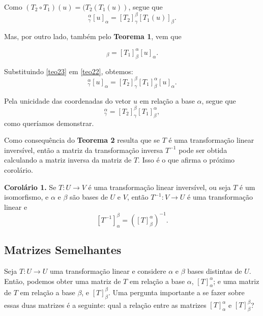 Como $(T_2 \circ T_1)(u)=(T_2 ( T_1(u))$, segue  que
\begin{equation}
[T_2 \circ T_1]_{\gamma}^{\alpha}[u]_{\alpha}=[T_2 ]_{\gamma}^{\beta}[T_1(u)]_{\beta}.\label{teo22}
\end{equation}

Mas, por outro lado, também pelo \textbf{Teorema 1}, vem que

\begin{equation}
[T_1(u)]_{\beta}=[T_1]_{\beta}^{\alpha}[u]_{\alpha}.\label{teo23}
\end{equation}

Substituindo \eqref{teo23} em \eqref{teo22}, obtemos:
\begin{equation}
[T_2 \circ T_1]_{\gamma}^{\alpha}[u]_{\alpha}=[T_2 ]_{\gamma}^{\beta}[T_1]_{\beta}^{\alpha}[u]_{\alpha}.\label{teo24}
\end{equation}

Pela unicidade das coordenadas do vetor $u$ em relação a base $\alpha$, segue que
\begin{equation*}
[T_2 \circ T_1]_{\gamma}^{\alpha}=[T_2 ]_{\gamma}^{\beta}[T_1]_{\beta}^{\alpha},
\end{equation*}
como queríamos demonstrar.

\vspace{0.5cm}
Como consequência do \textbf{Teorema 2} resulta que se $T$  é uma transformação linear inversível, então a matriz da transformação inversa $T^{-1}$  pode ser obtida calculando a matriz inversa  da matriz de $T$. Isso é o que afirma o próximo corolário.

\vspace{0.5cm}
\noindent\textbf{Corolário 1.} Se  $T: U \rightarrow V$  é uma transformação linear inversível, ou seja $T$ é um isomorfismo, e $\alpha$ e   $\beta$ são  bases de $U$ e $V$, então  $T^{-1}: V \rightarrow U$ é uma transformação linear e $$[T^{-1} ]_{\alpha}^{\beta} = \left( [T]_{\beta}^{\alpha}\right)^{-1}.$$



\subsection{Matrizes Semelhantes}

Seja  $T:U \rightarrow U$ uma transformação linear e considere $\alpha$ e $\beta$ bases distintas de  $U$.  Então,  podemos obter uma matriz de $T$ em relação a base $\alpha$,  $[T]_{\alpha}^{\alpha}$; e uma matriz de $T$ em relação a base $\beta$,    e  $[T]_{\beta}^{\beta}$.  Uma pergunta importante a se fazer sobre essas duas matrizes  é a seguinte: qual a relação entre as matrizes $[T]_{\alpha}^{\alpha}$ e $[T]_{\beta}^{\beta}$?

